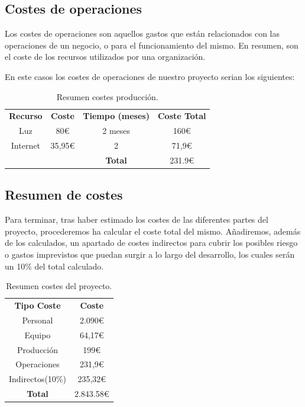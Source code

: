 \subsection{Costes de operaciones}

Los costes de operaciones son aquellos gastos que están relacionados con las operaciones de un negocio, o para el funcionamiento del mismo. En resumen, son el coste de los recursos utilizados por una organización.

En este casos los costes de operaciones de nuestro proyecto serian los siguientes:

\begin{table}[H]
	\begin{center}
		\begin{tabular}{| c | c | c | c |}
			\hline
			
			\textbf{Recurso} & \textbf{Coste} & \textbf{Tiempo (meses)} & \textbf{Coste Total} \\
			Luz & 80€ & 2 meses & 160€ \\
			Internet & 35,95€ & 2 & 71,9€ \\
			 & & \textbf{Total} & 231.9€ \\ \hline
		\end{tabular}
		\caption{Resumen costes producción.}
	\end{center}
\end{table}


\subsection{Resumen de costes}

Para terminar, tras haber estimado los costes de las diferentes partes del proyecto, procederemos ha calcular el coste total del mismo. Añadiremos, además de los calculados, un apartado de costes indirectos para cubrir los posibles riesgo o gastos imprevistos que puedan surgir a lo largo del desarrollo, los cuales serán un 10\% del total calculado.

\begin{table}[H]
	\begin{center}
		\begin{tabular}{| c | c |}
			\hline
			
			\textbf{Tipo Coste} & \textbf{Coste} \\
			Personal & 2.090€ \\
			Equipo & 64,17€ \\
			Producción & 199€ \\
			Operaciones & 231,9€ \\
			Indirectos(10\%) & 235,32€ \\
			\textbf{Total} & 2.843.58€ \\ \hline
		\end{tabular}
		\caption{Resumen costes del proyecto.}
	\end{center}
\end{table}


